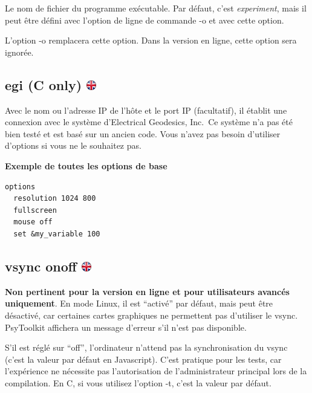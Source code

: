 \documentclass[
]{book}
\begin{document}
Le nom de fichier du programme exécutable. Par défaut, c'est
\emph{experiment}, mais il peut être défini avec l'option de ligne de
commande -o et avec cette option.

L'option -o remplacera cette option. Dans la version en ligne, cette
option sera ignorée.

\hypertarget{egi-c-only}{%
\subsection[egi (C only) ]{\texorpdfstring{egi (C only)
\href{https://www.psytoolkit.org/doc3.2.0/syntax.html\#options-egi}{\protect\includegraphics{img/ukflag.png}}}{egi (C only) }}\label{egi-c-only}}

Avec le nom ou l'adresse IP de l'hôte et le port IP (facultatif), il
établit une connexion avec le système d'Electrical Geodesics, Inc.~Ce
système n'a pas été bien testé et est basé sur un ancien code. Vous
n'avez pas besoin d'utiliser d'options si vous ne le souhaitez pas.

\textbf{Exemple de toutes les options de base}

\begin{verbatim}
options
  resolution 1024 800
  fullscreen
  mouse off
  set &my_variable 100
\end{verbatim}

\hypertarget{vsync-onoff}{%
\subsection[vsync on\textbar off ]{\texorpdfstring{vsync on\textbar off
\href{https://www.psytoolkit.org/doc3.2.0/syntax.html\#options_vsync_off}{\protect\includegraphics{img/ukflag.png}}}{vsync on\textbar off }}\label{vsync-onoff}}

\textbf{Non pertinent pour la version en ligne et pour utilisateurs
avancés uniquement}. En mode Linux, il est ``activé'' par défaut, mais
peut être désactivé, car certaines cartes graphiques ne permettent pas
d'utiliser le vsync. PsyToolkit affichera un message d'erreur s'il n'est
pas disponible.

S'il est réglé sur ``off'', l'ordinateur n'attend pas la synchronisation
du vsync (c'est la valeur par défaut en Javascript). C'est pratique pour
les tests, car l'expérience ne nécessite pas l'autorisation de
l'administrateur principal lors de la compilation. En C, si vous
utilisez l'option -t, c'est la valeur par défaut.
\end{document}

